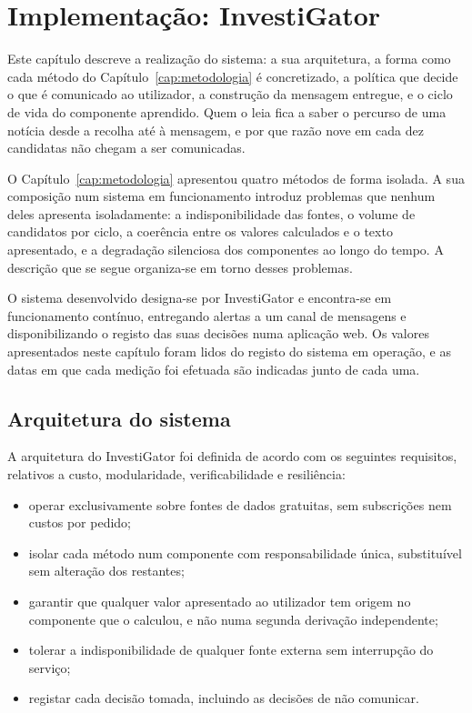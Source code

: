 \chapter{Implementação: InvestiGator}
\label{cap:sistema}

Este capítulo descreve a realização do sistema: a sua arquitetura, a forma como cada método do
Capítulo~\ref{cap:metodologia} é concretizado, a política que decide o que é comunicado ao
utilizador, a construção da mensagem entregue, e o ciclo de vida do componente aprendido. Quem o leia fica a saber o percurso de uma notícia desde a recolha até à mensagem, e por que razão nove em cada dez candidatas não chegam a ser comunicadas.

O Capítulo~\ref{cap:metodologia} apresentou quatro métodos de forma isolada. A sua composição num sistema em funcionamento introduz problemas que nenhum deles apresenta
isoladamente: a indisponibilidade das fontes, o volume de candidatos por ciclo, a coerência entre
os valores calculados e o texto apresentado, e a degradação silenciosa dos componentes ao longo do
tempo. A descrição que se segue organiza-se em
torno desses problemas.

O sistema desenvolvido designa-se por InvestiGator e encontra-se em funcionamento contínuo,
entregando alertas a um canal de mensagens e disponibilizando o registo das suas decisões numa
aplicação web. Os valores apresentados neste capítulo foram lidos do registo do sistema em
operação, e as datas em que cada medição foi efetuada são indicadas junto de cada uma.

\section{Arquitetura do sistema}
\label{sec:sis_arquitetura}

A arquitetura do InvestiGator foi definida de acordo com os seguintes requisitos, relativos a
custo, modularidade, verificabilidade e resiliência:

\begin{itemize}
  \item operar exclusivamente sobre fontes de dados gratuitas, sem subscrições nem custos por
        pedido;
  \item isolar cada método num componente com responsabilidade única, substituível sem alteração
        dos restantes;
  \item garantir que qualquer valor apresentado ao utilizador tem origem no componente que o
        calculou, e não numa segunda derivação independente;
  \item tolerar a indisponibilidade de qualquer fonte externa sem interrupção do serviço;
  \item registar cada decisão tomada, incluindo as decisões de não comunicar.
\end{itemize}

